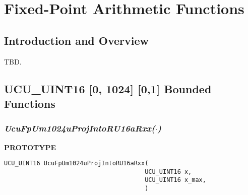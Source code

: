
\chapter{Fixed-Point Arithmetic Functions}

\label{cfpa0}

\section{Introduction and Overview}
\label{cfpa0:siov0}

TBD.


\section{UCU\_UINT16 [0, 1024] [0,1] Bounded Functions}
\label{cfpa0:subf0}


\subsection[\emph{UcuFpUm1024uProjIntoRU16aRxx(\protect\mbox{\protect$\cdot$})}]
           {\emph{UcuFpUm1024uProjIntoRU16aRxx(\protect\mbox{\protect\boldmath $\cdot$})}}
\label{cfpa0:subf0:sfaa0}

%

\noindent\textbf{PROTOTYPE}
\begin {list}{}{\setlength{\leftmargin}{0.25in}\setlength{\topsep}{0.0in}}
\item
\begin{verbatim}
UCU_UINT16 UcuFpUm1024uProjIntoRU16aRxx(
                                       UCU_UINT16 x, 
                                       UCU_UINT16 x_max, 
                                       )
\end{verbatim}
\end{list}
\vspace{2.8ex}

